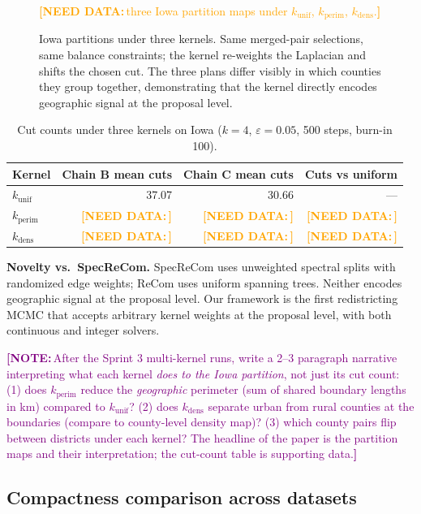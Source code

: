 \documentclass[11pt]{article}
\newcommand{\needdata}[1]{\textcolor{orange}{\textbf{[NEED DATA:}\,#1\textbf{]}}}
\newcommand{\note}[1]{\textcolor{purple}{\textbf{[NOTE:}\,#1\textbf{]}}}
\begin{document}
\begin{figure}[H]
  \centering
  \needdata{three Iowa partition maps under $k_{\mathrm{unif}}$,
    $k_{\mathrm{perim}}$, $k_{\mathrm{dens}}$.}\\
  \caption{Iowa partitions under three kernels. Same merged-pair
    selections, same balance constraints; the kernel re-weights the
    Laplacian and shifts the chosen cut. The three plans differ
    visibly in which counties they group together, demonstrating that
    the kernel directly encodes geographic signal at the proposal
    level.}
  \label{fig:multikernel-iowa}
\end{figure}

\begin{table}[H]
\centering
\small
\begin{tabular}{lrrr}
\toprule
Kernel & Chain B mean cuts & Chain C mean cuts & Cuts vs uniform \\
\midrule
$k_{\mathrm{unif}}$  & 37.07 & 30.66 & ---           \\
$k_{\mathrm{perim}}$ & \needdata{} & \needdata{} & \needdata{} \\
$k_{\mathrm{dens}}$  & \needdata{} & \needdata{} & \needdata{} \\
\bottomrule
\end{tabular}
\caption{Cut counts under three kernels on Iowa ($k = 4$,
  $\varepsilon = 0.05$, 500 steps, burn-in 100).}\label{tab:multikernel-iowa}
\end{table}

\textbf{Novelty vs.\ SpecReCom.} SpecReCom uses unweighted spectral
splits with randomized edge weights; ReCom uses uniform spanning trees.
Neither encodes geographic signal at the proposal level. Our framework
is the first redistricting MCMC that accepts arbitrary kernel weights
at the proposal level, with both continuous and integer solvers.

\note{After the Sprint 3 multi-kernel runs, write a 2--3 paragraph
narrative interpreting what each kernel \emph{does to the Iowa
partition}, not just its cut count:
(1) does $k_{\mathrm{perim}}$ reduce the \emph{geographic} perimeter
(sum of shared boundary lengths in km) compared to $k_{\mathrm{unif}}$?
(2) does $k_{\mathrm{dens}}$ separate urban from rural counties at the
boundaries (compare to county-level density map)?
(3) which county pairs flip between districts under each kernel?
The headline of the paper is the partition maps and their
interpretation; the cut-count table is supporting data.}

\subsection{Compactness comparison across datasets}\label{sec:exp-compactness}
\end{document}
